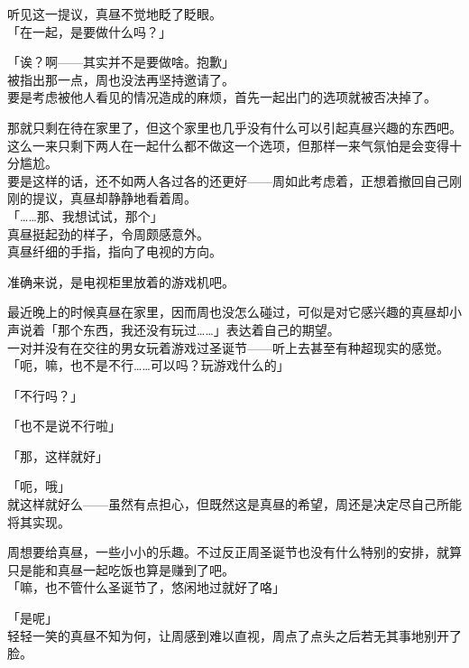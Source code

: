 听见这一提议，真昼不觉地眨了眨眼。\\

「在一起，是要做什么吗？」

「诶？啊——其实并不是要做啥。抱歉」\\

被指出那一点，周也没法再坚持邀请了。\\

要是考虑被他人看见的情况造成的麻烦，首先一起出门的选项就被否决掉了。

那就只剩在待在家里了，但这个家里也几乎没有什么可以引起真昼兴趣的东西吧。\\

这么一来只剩下两人在一起什么都不做这一个选项，但那样一来气氛怕是会变得十分尴尬。\\

要是这样的话，还不如两人各过各的还更好——周如此考虑着，正想着撤回自己刚刚的提议，真昼却静静地看着周。\\

「……那、我想试试，那个」\\

真昼挺起劲的样子，令周颇感意外。\\

真昼纤细的手指，指向了电视的方向。

准确来说，是电视柜里放着的游戏机吧。

最近晚上的时候真昼在家里，因而周也没怎么碰过，可似是对它感兴趣的真昼却小声说着「那个东西，我还没有玩过……」表达着自己的期望。\\

一对并没有在交往的男女玩着游戏过圣诞节——听上去甚至有种超现实的感觉。\\

「呃，嘛，也不是不行……可以吗？玩游戏什么的」

「不行吗？」

「也不是说不行啦」

「那，这样就好」

「呃，哦」\\

就这样就好么——虽然有点担心，但既然这是真昼的希望，周还是决定尽自己所能将其实现。

周想要给真昼，一些小小的乐趣。不过反正周圣诞节也没有什么特别的安排，就算只是能和真昼一起吃饭也算是赚到了吧。\\

「嘛，也不管什么圣诞节了，悠闲地过就好了咯」

「是呢」\\

轻轻一笑的真昼不知为何，让周感到难以直视，周点了点头之后若无其事地别开了脸。
